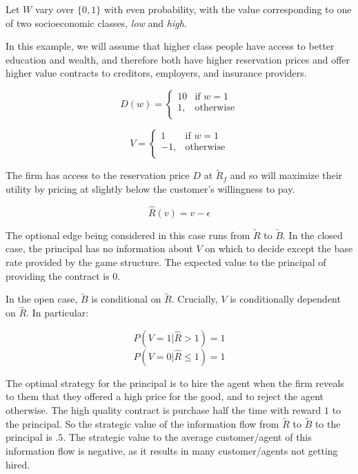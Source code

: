 \documentclass[../thesis.tex]{subfiles}
\begin{document}
\begin{exm}
  Let $W$ vary over $\{0,1\}$ with even probability,
  with the value corresponding to one of two socioeconomic
  classes, \emph{low} and \emph{high}.

  In this example, we will assume that higher class people
  have access to better education and wealth, and therefore
  both have higher reservation prices and offer higher value
  contracts to creditors, employers, and insurance providers.

  $$D(w) = \begin{cases}
    10 & \text{if } w  = 1 \\
    1, & \text{otherwise}\\
  \end{cases}$$
  
  $$V = \begin{cases}
    1 & \text{if } w  = 1 \\
    -1, & \text{otherwise}\\
  \end{cases}$$

  The firm has access to the reservation price $D$
  at $\tilde{R}_f$ and so will maximize their utility
  by pricing at slightly below the customer's willingness
  to pay.

  $$\hat{R}(v) = v - \epsilon$$

  The optional edge being considered in this case runs
  from $\tilde{R}$ to $\tilde{B}$.
  In the closed case, the principal has no information
  about $V$ on which to decide except the base rate
  provided by the game structure.
  The expected value to the principal of providing the contract
  is $0$.

  In the open case, $\tilde{B}$ is conditional on $\tilde{R}$.
  Crucially, $V$ is conditionally dependent on $\hat{R}$.
  In particular:

  $$P(V = 1 \vert \hat{R} > 1) = 1$$
  $$P(V = 0 \vert \hat{R} \leq 1) = 1$$

  The optimal strategy for the principal is to hire
  the agent when the firm reveals to them that they offered
  a high price for the good, and to reject the agent otherwise.
  The high quality contract is purchase half the time with reward
  $1$ to the principal.
  So the strategic value of the information flow from $\tilde{R}$
  to $\tilde{B}$ to the principal is $.5$.
  The strategic value to the average customer/agent of this information flow
  is negative, as it results in many customer/agents not getting hired.
\end{exm}
\end{document}
